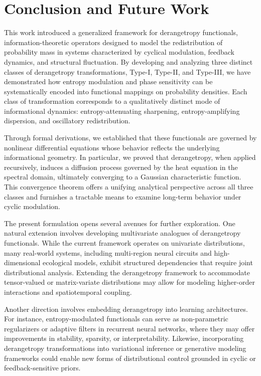 \documentclass[sn-mathphys-num]{sn-jnl}%
\theoremstyle{thmstyleone}%
\theoremstyle{thmstyletwo}%
\theoremstyle{thmstylethree}%
\begin{document}
\section{Conclusion and Future Work}
\label{Sec:Conclusion}

This work introduced a generalized framework for derangetropy functionals, information-theoretic operators designed to model the redistribution of probability mass in systems characterized by cyclical modulation, feedback dynamics, and structural fluctuation. By developing and analyzing three distinct classes of derangetropy transformations, Type-I, Type-II, and Type-III, we have demonstrated how entropy modulation and phase sensitivity can be systematically encoded into functional mappings on probability densities. Each class of transformation corresponds to a qualitatively distinct mode of informational dynamics: entropy-attenuating sharpening, entropy-amplifying dispersion, and oscillatory redistribution.

Through formal derivations, we established that these functionals are governed by nonlinear differential equations whose behavior reflects the underlying informational geometry. In particular, we proved that derangetropy, when applied recursively, induces a diffusion process governed by the heat equation in the spectral domain, ultimately converging to a Gaussian characteristic function. This convergence theorem offers a unifying analytical perspective across all three classes and furnishes a tractable means to examine long-term behavior under cyclic modulation.

The present formulation opens several avenues for further exploration. One natural extension involves developing multivariate analogues of derangetropy functionals. While the current framework operates on univariate distributions, many real-world systems, including multi-region neural circuits and high-dimensional ecological models, exhibit structured dependencies that require joint distributional analysis. Extending the derangetropy framework to accommodate tensor-valued or matrix-variate distributions may allow for modeling higher-order interactions and spatiotemporal coupling.

Another direction involves embedding derangetropy into learning architectures. For instance, entropy-modulated functionals can serve as non-parametric regularizers or adaptive filters in recurrent neural networks, where they may offer improvements in stability, sparsity, or interpretability. Likewise, incorporating derangetropy transformations into variational inference or generative modeling frameworks could enable new forms of distributional control grounded in cyclic or feedback-sensitive priors.
\end{document}
